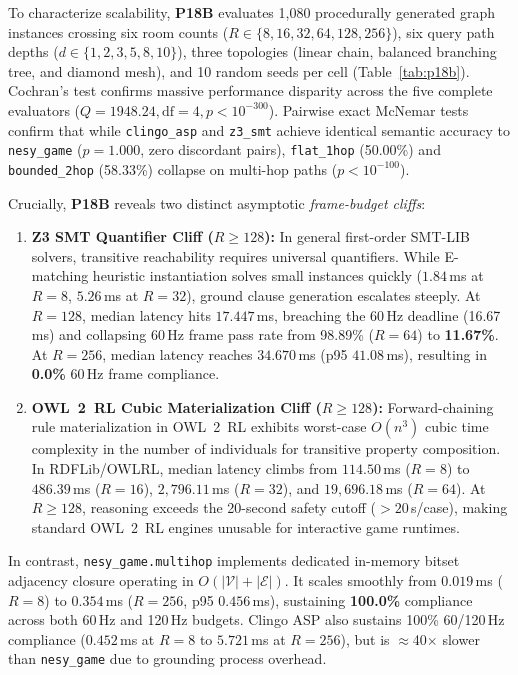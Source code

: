To characterize scalability, \textbf{P18B} evaluates 1,080 procedurally generated graph instances crossing six room counts ($R \in \{8, 16, 32, 64, 128, 256\}$), six query path depths ($d \in \{1, 2, 3, 5, 8, 10\}$), three topologies (linear chain, balanced branching tree, and diamond mesh), and 10 random seeds per cell (Table~\ref{tab:p18b}). Cochran's test confirms massive performance disparity across the five complete evaluators ($Q = 1948.24, \text{df}=4, p < 10^{-300}$). Pairwise exact McNemar tests confirm that while \texttt{clingo\_asp} and \texttt{z3\_smt} achieve identical semantic accuracy to \texttt{nesy\_game} ($p = 1.000$, zero discordant pairs), \texttt{flat\_1hop} (50.00\%) and \texttt{bounded\_2hop} (58.33\%) collapse on multi-hop paths ($p < 10^{-100}$).

Crucially, \textbf{P18B} reveals two distinct asymptotic \textit{frame-budget cliffs}:
\begin{enumerate}
\item \textbf{Z3 SMT Quantifier Cliff ($R \ge 128$):} In general first-order SMT-LIB solvers, transitive reachability requires universal quantifiers. While E-matching heuristic instantiation solves small instances quickly ($1.84$\,ms at $R{=}8$, $5.26$\,ms at $R{=}32$), ground clause generation escalates steeply. At $R{=}128$, median latency hits $17.447$\,ms, breaching the 60\,Hz deadline (16.67\,ms) and collapsing 60\,Hz frame pass rate from 98.89\% ($R{=}64$) to \textbf{11.67\%}. At $R{=}256$, median latency reaches $34.670$\,ms (p95 $41.08$\,ms), resulting in \textbf{0.0\%} 60\,Hz frame compliance.
\item \textbf{OWL~2~RL Cubic Materialization Cliff ($R \ge 128$):} Forward-chaining rule materialization in OWL~2~RL exhibits worst-case $O(n^3)$ cubic time complexity in the number of individuals for transitive property composition. In RDFLib/OWLRL, median latency climbs from $114.50$\,ms ($R{=}8$) to $486.39$\,ms ($R{=}16$), $2,796.11$\,ms ($R{=}32$), and $19,696.18$\,ms ($R{=}64$). At $R \ge 128$, reasoning exceeds the 20-second safety cutoff ($>20$\,s/case), making standard OWL~2~RL engines unusable for interactive game runtimes.
\end{enumerate}
In contrast, \texttt{nesy\_game.multihop} implements dedicated in-memory bitset adjacency closure operating in $O(|\mathcal{V}| + |\mathcal{E}|)$. It scales smoothly from $0.019$\,ms ($R{=}8$) to $0.354$\,ms ($R{=}256$, p95 $0.456$\,ms), sustaining \textbf{100.0\%} compliance across both 60\,Hz and 120\,Hz budgets. Clingo ASP also sustains 100\% 60/120\,Hz compliance ($0.452$\,ms at $R{=}8$ to $5.721$\,ms at $R{=}256$), but is $\approx$40$\times$ slower than \texttt{nesy\_game} due to grounding process overhead.

